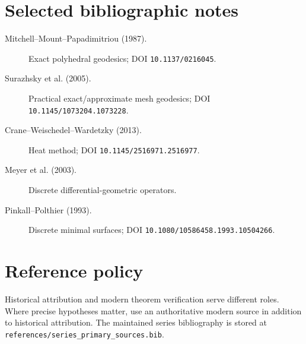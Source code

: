 \section*{Selected bibliographic notes}
\begin{description}
\item[Mitchell--Mount--Papadimitriou (1987).] Exact polyhedral geodesics; DOI \texttt{10.1137/0216045}.

\item[Surazhsky et al. (2005).] Practical exact/approximate mesh geodesics; DOI \texttt{10.1145/1073204.1073228}.

\item[Crane--Weischedel--Wardetzky (2013).] Heat method; DOI \texttt{10.1145/2516971.2516977}.

\item[Meyer et al. (2003).] Discrete differential-geometric operators.

\item[Pinkall--Polthier (1993).] Discrete minimal surfaces; DOI \texttt{10.1080/10586458.1993.10504266}.

\end{description}

\section*{Reference policy}
Historical attribution and modern theorem verification serve different roles.
Where precise hypotheses matter, use an authoritative modern source in addition to historical attribution.
The maintained series bibliography is stored at \texttt{references/series\_primary\_sources.bib}.
